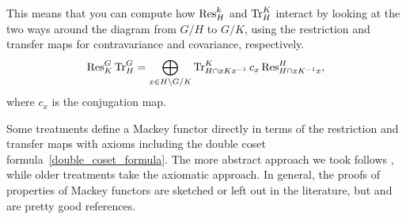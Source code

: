 This means that you can compute how $\operatorname{Res}_H^k$ and $\operatorname{Tr}_H^K$ interact by looking at the two ways around the
diagram from $G/H$ to $G/K$, using the restriction and transfer maps for contravariance and covariance,
respectively.
\begin{equation}
\label{double_coset_formula}
\operatorname{Res}_K^G\operatorname{Tr}_H^G = \bigoplus_{x\in H\backslash G/K} \operatorname{Tr}_{H\cap xKx^{-1}}^K c_x\operatorname{Res}_{H\cap xK^{-1}x}^H,
\end{equation}
where $c_x$ is the conjugation map.
\begin{rem}
Some treatments define a Mackey functor directly in terms of the restriction and transfer maps with axioms
including the double coset formula~\eqref{double_coset_formula}. The more abstract approach we took follows
\cite{Dress}, while older treatments take the axiomatic approach. In general, the proofs of properties of Mackey
functors are sketched or left out in the literature, but \cite{Webb} and  are pretty good
references.
\end{rem}

